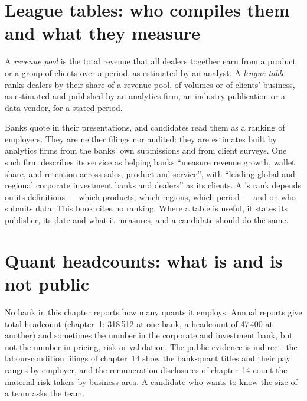 \section{League tables: who compiles them and what they measure}

\begin{definition}\label{def:in:bank-markets-divisions:league}
A \emph{revenue pool} is the total revenue that all dealers together earn from a product or a group
of clients over a period, as estimated by an analyst. A \emph{league table} ranks dealers by their
share of a revenue pool, of volumes or of clients' business, as estimated and published by an analytics firm, an
industry publication or a data vendor, for a stated period.
\end{definition}

Banks quote  in their presentations, and candidates read them as a ranking of employers. They are neither
filings nor audited: they are estimates built by analytics firms from the banks' own submissions and from client
surveys. One such firm describes its service as helping banks ``measure revenue growth, wallet share, and retention
across sales, product and service'', with ``leading global and regional corporate investment banks and dealers'' as its
clients. A 's rank depends on its definitions --- which products, which regions, which period --- and on
who submits data. This book cites no ranking. Where a table is useful, it states its publisher, its date and what it
measures, and a candidate should do the same.

\section{Quant headcounts: what is and is not public}

No bank in this chapter reports how many quants it employs. Annual reports give total headcount (chapter~1: 318\,512 at
one bank, a headcount of 47\,400 at another) and sometimes the number in the corporate and investment bank, but not the
number in pricing, risk or validation. The public evidence is indirect: the labour-condition filings of chapter~14 show
the bank-quant titles and their pay ranges by employer, and the remuneration disclosures of chapter~14 count the
material risk takers by business area. A candidate who wants to know the size of a team asks the team.

